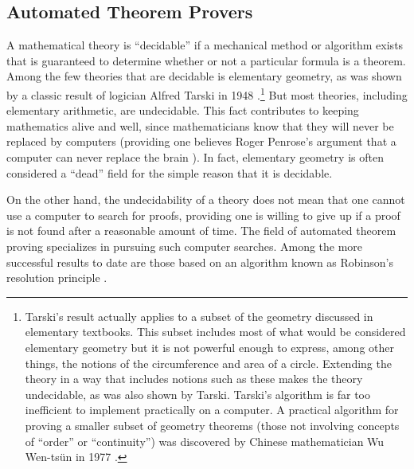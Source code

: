 \subsection{Automated Theorem Provers}\label{theoremprovers}

A mathematical theory is ``decidable'' if a mechanical
method or algorithm exists that is guaranteed to determine whether or not a
particular formula is a theorem.  Among the few theories that are decidable is
elementary geometry, as was shown by a classic
result of logician Alfred Tarski in 1948
\cite{Tarski}.\footnote{Tarski's result actually applies to a subset of the
geometry discussed in elementary textbooks.  This subset includes most of what
would be considered elementary geometry but it is not powerful enough to
express, among other things, the notions of the circumference and area of a
circle.  Extending the theory in a way that includes notions such as these
makes the theory undecidable, as was also shown by Tarski.  Tarski's algorithm
is far too inefficient to implement practically on a computer.  A practical
algorithm for proving a smaller subset of geometry theorems (those not
involving concepts of ``order'' or ``continuity'') was discovered by Chinese
mathematician Wu Wen-ts\"{u}n in 1977 \cite{Chou}.}  But most theories, including
elementary arithmetic, are undecidable.  This fact contributes to keeping
mathematics alive and well, since mathematicians know that they will never be
replaced by computers (providing one believes Roger Penrose's argument that a
computer can never replace the brain \cite{Penrose}). In
fact,  elementary geometry is often considered a ``dead'' field for the simple
reason that it is decidable.

On the other hand, the undecidability of a theory does not mean that one cannot
use a computer to search for proofs, providing one is willing to give up if a
proof is not found after a reasonable amount of time.  The field of automated
theorem proving specializes in pursuing such
computer searches.  Among the more successful results to date are those based
on an algorithm known as Robinson's resolution principle
\cite{Robinson}.

